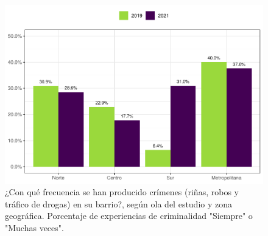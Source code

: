\documentclass[
  12pt,
]{book}
\begin{document}
\begin{figure}

{\centering \includegraphics{reporte-elsoc_files/figure-latex/crim-zona-1} 

}

\caption{¿Con qué frecuencia se han producido crímenes (riñas, robos y tráfico de drogas) en su barrio?, según ola del estudio y zona geográfica. Porcentaje de experiencias de criminalidad "Siempre" o "Muchas veces".}\label{fig:crim-zona}
\end{figure}
\end{document}
